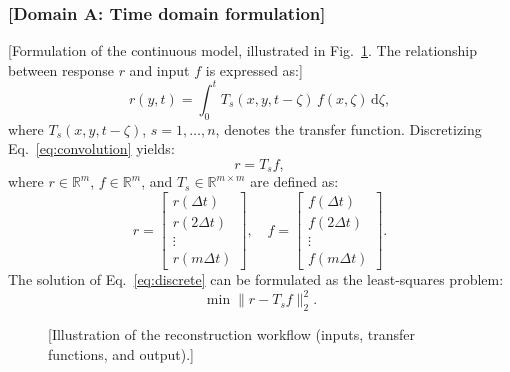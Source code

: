 \documentclass[final,5p,times,twocolumn]{elsarticle}
\begin{document}
\subsubsection{[Domain A: Time domain formulation]}\label{subsubsec:sec2_1_1}

[Formulation of the continuous model, illustrated in Fig.~\ref{fig:sec2_workflow}. The relationship between response $r$ and input $f$ is expressed as:]
\begin{equation}\label{eq:convolution}
    r(y,t) = \int_{0}^{t} T_{s}(x,y,t-\zeta)\, f(x,\zeta)\, \mathrm{d}\zeta,
\end{equation}
where $T_{s}(x,y,t-\zeta)$, $s = 1, \dots, n$, denotes the transfer function. Discretizing Eq.~\eqref{eq:convolution} yields:
\begin{equation}\label{eq:discrete}
    r = T_{s} f,
\end{equation}
where $r \in \mathbb{R}^{m}$, $f \in \mathbb{R}^{m}$, and $T_{s} \in \mathbb{R}^{m \times m}$ are defined as:
\begin{equation}\label{eq:matrices}
    r =
    \begin{bmatrix}
        r(\Delta t) \\
        r(2\Delta t) \\
        \vdots \\
        r(m\Delta t)
    \end{bmatrix},
    \quad
    f =
    \begin{bmatrix}
        f(\Delta t) \\
        f(2\Delta t) \\
        \vdots \\
        f(m\Delta t)
    \end{bmatrix}.
\end{equation}
The solution of Eq.~\eqref{eq:discrete} can be formulated as the least-squares problem:
\begin{equation}\label{eq:lsq}
    \min \| r - T_{s} f \|_{2}^{2}.
\end{equation}

\begin{figure}[t]
    \centering
    \caption{[Illustration of the reconstruction workflow (inputs, transfer functions, and output).]}
    \label{fig:sec2_workflow}
\end{figure}
\end{document}
